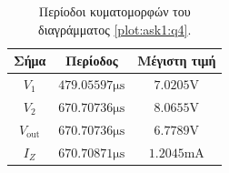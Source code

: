 \begin{table}[h]
	\begin{center}
		\begin{tabular}{|c|c|c|}
			\hline
			\textbf{Σήμα}      & \textbf{Περίοδος}               & \textbf{Μέγιστη τιμή}        \\
			\hline
			\hline
			$V_1$              & $479.05597\unit{\micro\second}$ & $7.0205\unit{\volt}$         \\\hline
			$V_2$              & $670.70736\unit{\micro\second}$ & $8.0655\unit{\volt}$         \\\hline
			$V_{\mathrm{out}}$ & $670.70736\unit{\micro\second}$ & $6.7789\unit{\volt}$         \\\hline
			$I_Z$              & $670.70871\unit{\micro\second}$ & $1.2045\unit{\milli\ampere}$ \\\hline
		\end{tabular}
		\caption{Περίοδοι κυματομορφών του διαγράμματος \ref{plot:ask1:q4}.}
		\label{table:ask1:q4:periods}
	\end{center}
\end{table}